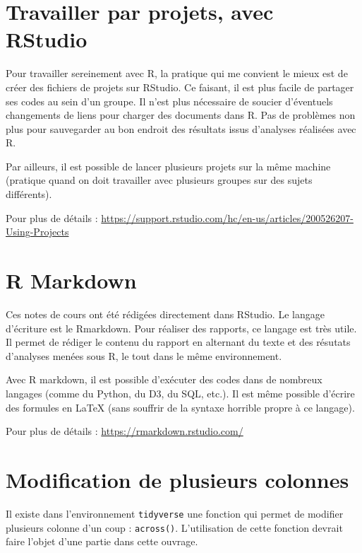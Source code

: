 \documentclass[
  11pt,
]{book}
\numberwithin{equation}{section}
\numberwithin{countremarque}{section}
\begin{document}
\hypertarget{travailler-par-projets-avec-rstudio}{%
\section{Travailler par projets, avec RStudio}\label{travailler-par-projets-avec-rstudio}}

Pour travailler sereinement avec R, la pratique qui me convient le mieux est de créer des fichiers de projets sur RStudio. Ce faisant, il est plus facile de partager ses codes au sein d'un groupe. Il n'est plus nécessaire de soucier d'éventuels changements de liens pour charger des documents dans R. Pas de problèmes non plus pour sauvegarder au bon endroit des résultats issus d'analyses réalisées avec R.

Par ailleurs, il est possible de lancer plusieurs projets sur la même machine (pratique quand on doit travailler avec plusieurs groupes sur des sujets différents).

Pour plus de détails : \url{https://support.rstudio.com/hc/en-us/articles/200526207-Using-Projects}

\hypertarget{r-markdown}{%
\section{R Markdown}\label{r-markdown}}

Ces notes de cours ont été rédigées directement dans RStudio. Le langage d'écriture est le Rmarkdown. Pour réaliser des rapports, ce langage est très utile. Il permet de rédiger le contenu du rapport en alternant du texte et des résutats d'analyses menées sous R, le tout dans le même environnement.

Avec R markdown, il est possible d'exécuter des codes dans de nombreux langages (comme du Python, du D3, du SQL, etc.). Il est même possible d'écrire des formules en LaTeX (sans souffrir de la syntaxe horrible propre à ce langage).

Pour plus de détails : \url{https://rmarkdown.rstudio.com/}

\hypertarget{modification-de-plusieurs-colonnes}{%
\section{Modification de plusieurs colonnes}\label{modification-de-plusieurs-colonnes}}

Il existe dans l'environnement \texttt{tidyverse} une fonction qui permet de modifier plusieurs colonne d'un coup : \texttt{across()}. L'utilisation de cette fonction devrait faire l'objet d'une partie dans cette ouvrage.
\end{document}
